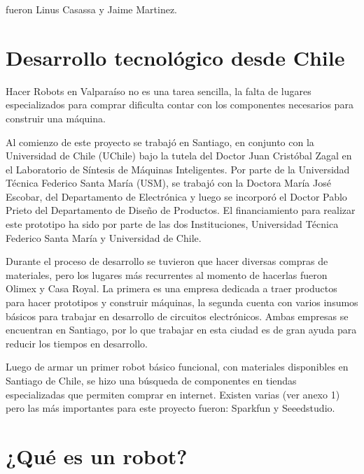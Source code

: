 fueron Linus Casassa y Jaime Martinez. 



\section{Desarrollo tecnológico desde Chile}

Hacer Robots en Valparaíso no es una tarea sencilla, la falta de lugares especializados para comprar dificulta contar con los componentes necesarios para construir una máquina.

Al comienzo de este proyecto se trabajó en Santiago, en conjunto con la Universidad de Chile (UChile) bajo la tutela del Doctor Juan Cristóbal Zagal en el Laboratorio de Síntesis de Máquinas Inteligentes. Por parte de la Universidad Técnica Federico Santa María (USM), se trabajó con la Doctora María José Escobar, del Departamento de Electrónica y luego se incorporó el Doctor Pablo Prieto del Departamento de Diseño de Productos. El financiamiento para realizar este prototipo ha sido por parte de las dos Instituciones, Universidad Técnica Federico Santa María y Universidad de Chile.

Durante el proceso de desarrollo se tuvieron que hacer diversas compras de materiales, pero los lugares más recurrentes al momento de hacerlas fueron Olimex y Casa Royal. La primera es una empresa dedicada a traer productos para hacer prototipos y construir máquinas, la segunda cuenta con varios insumos básicos para trabajar en desarrollo de circuitos electrónicos. Ambas empresas se encuentran en Santiago, por lo que trabajar en esta ciudad es de gran ayuda para reducir los tiempos en desarrollo.

Luego de armar un primer robot básico funcional, con materiales disponibles en Santiago de Chile, se hizo una búsqueda de componentes en tiendas especializadas que permiten comprar en internet. Existen varias (ver anexo 1) pero las más importantes para este proyecto fueron: Sparkfun y Seeedstudio.





\section{¿Qué es un robot?}


